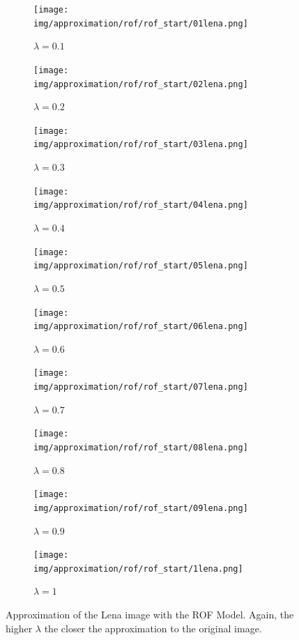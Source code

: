 \documentclass{scrreprt}
\begin{document}
            \begin{figure}[!ht]
                \centering
                \begin{subfigure}[b]{0.18\textwidth}
                    \texttt{[image: img/approximation/rof/rof\_start/01lena.png]}
                    \caption{$\lambda = 0.1$}
                \end{subfigure}
                \begin{subfigure}[b]{0.18\textwidth}
                    \texttt{[image: img/approximation/rof/rof\_start/02lena.png]}
                    \caption{$\lambda = 0.2$}
                \end{subfigure}
                \begin{subfigure}[b]{0.18\textwidth}
                    \texttt{[image: img/approximation/rof/rof\_start/03lena.png]}
                    \caption{$\lambda = 0.3$}
                \end{subfigure}
                \begin{subfigure}[b]{0.18\textwidth}
                    \texttt{[image: img/approximation/rof/rof\_start/04lena.png]}
                    \caption{$\lambda = 0.4$}
                \end{subfigure}
                \begin{subfigure}[b]{0.18\textwidth}
                    \texttt{[image: img/approximation/rof/rof\_start/05lena.png]}
                    \caption{$\lambda = 0.5$}
                \end{subfigure}
                \begin{subfigure}[b]{0.18\textwidth}
                    \texttt{[image: img/approximation/rof/rof\_start/06lena.png]}
                    \caption{$\lambda = 0.6$}
                \end{subfigure}
                \begin{subfigure}[b]{0.18\textwidth}
                    \texttt{[image: img/approximation/rof/rof\_start/07lena.png]}
                    \caption{$\lambda = 0.7$}
                \end{subfigure}
                \begin{subfigure}[b]{0.18\textwidth}
                    \texttt{[image: img/approximation/rof/rof\_start/08lena.png]}
                    \caption{$\lambda = 0.8$}
                \end{subfigure}
                \begin{subfigure}[b]{0.18\textwidth}
                    \texttt{[image: img/approximation/rof/rof\_start/09lena.png]}
                    \caption{$\lambda = 0.9$}
                \end{subfigure}
                \begin{subfigure}[b]{0.18\textwidth}
                    \texttt{[image: img/approximation/rof/rof\_start/1lena.png]}
                    \caption{$\lambda = 1$}
                \end{subfigure}
                \caption[Second estimate of $\lambda$ for the ROF model.]{Approximation of the Lena image with the ROF Model. Again, the higher $\lambda$ the closer the approximation to the original image.}
            \label{fig:rof_lena_second_compare}
            \end{figure}
\end{document}
